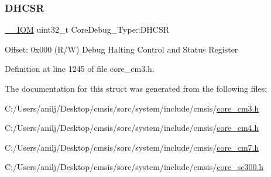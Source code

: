 \subsubsection{\texorpdfstring{D\+H\+C\+SR}{DHCSR}}
{\footnotesize\ttfamily \hyperlink{core__sc300_8h_ab6caba5853a60a17e8e04499b52bf691}{\+\_\+\+\_\+\+I\+OM} uint32\+\_\+t Core\+Debug\+\_\+\+Type\+::\+D\+H\+C\+SR}

Offset\+: 0x000 (R/W) Debug Halting Control and Status Register 

Definition at line 1245 of file core\+\_\+cm3.\+h.



The documentation for this struct was generated from the following files\+:\begin{DoxyCompactItemize}
\item 
C\+:/\+Users/anilj/\+Desktop/cmsis/sorc/system/include/cmsis/\hyperlink{core__cm3_8h}{core\+\_\+cm3.\+h}\item 
C\+:/\+Users/anilj/\+Desktop/cmsis/sorc/system/include/cmsis/\hyperlink{core__cm4_8h}{core\+\_\+cm4.\+h}\item 
C\+:/\+Users/anilj/\+Desktop/cmsis/sorc/system/include/cmsis/\hyperlink{core__cm7_8h}{core\+\_\+cm7.\+h}\item 
C\+:/\+Users/anilj/\+Desktop/cmsis/sorc/system/include/cmsis/\hyperlink{core__sc300_8h}{core\+\_\+sc300.\+h}\end{DoxyCompactItemize}
